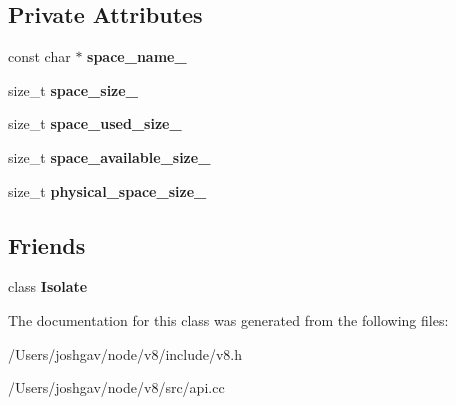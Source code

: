 \subsection*{Private Attributes}
\begin{DoxyCompactItemize}
\item 
const char $\ast$ {\bfseries space\+\_\+name\+\_\+}\hypertarget{classv8_1_1_heap_space_statistics_a042462c62d5789eda4cd8011f43b04e3}{}\label{classv8_1_1_heap_space_statistics_a042462c62d5789eda4cd8011f43b04e3}

\item 
size\+\_\+t {\bfseries space\+\_\+size\+\_\+}\hypertarget{classv8_1_1_heap_space_statistics_a982565762c12d6da18130e808ba7433a}{}\label{classv8_1_1_heap_space_statistics_a982565762c12d6da18130e808ba7433a}

\item 
size\+\_\+t {\bfseries space\+\_\+used\+\_\+size\+\_\+}\hypertarget{classv8_1_1_heap_space_statistics_ad0f8536bb48940cd95115439f02d48b1}{}\label{classv8_1_1_heap_space_statistics_ad0f8536bb48940cd95115439f02d48b1}

\item 
size\+\_\+t {\bfseries space\+\_\+available\+\_\+size\+\_\+}\hypertarget{classv8_1_1_heap_space_statistics_aff413d11dc7b0508cd246ef8e7c804e7}{}\label{classv8_1_1_heap_space_statistics_aff413d11dc7b0508cd246ef8e7c804e7}

\item 
size\+\_\+t {\bfseries physical\+\_\+space\+\_\+size\+\_\+}\hypertarget{classv8_1_1_heap_space_statistics_a961f81a0bdac0ffd6aa7d550d53d9e9b}{}\label{classv8_1_1_heap_space_statistics_a961f81a0bdac0ffd6aa7d550d53d9e9b}

\end{DoxyCompactItemize}
\subsection*{Friends}
\begin{DoxyCompactItemize}
\item 
class {\bfseries Isolate}\hypertarget{classv8_1_1_heap_space_statistics_aba4f0964bdacf2bbf62cf876e5d28d0a}{}\label{classv8_1_1_heap_space_statistics_aba4f0964bdacf2bbf62cf876e5d28d0a}

\end{DoxyCompactItemize}


The documentation for this class was generated from the following files\+:\begin{DoxyCompactItemize}
\item 
/\+Users/joshgav/node/v8/include/v8.\+h\item 
/\+Users/joshgav/node/v8/src/api.\+cc\end{DoxyCompactItemize}
